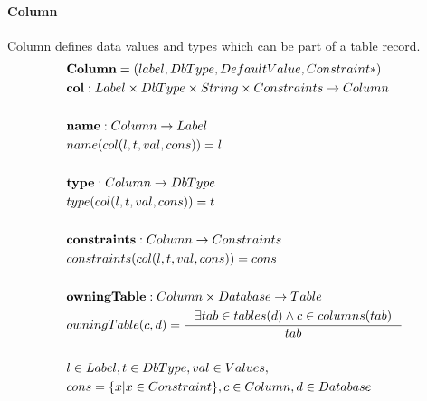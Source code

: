 \documentclass[11pt]{article}
\begin{document}
\paragraph{Column} Column defines data values and types which can be part of a table record.
\begin{align*}
&	\mathbf{Column} = (label, DbType, DefaultValue, Constraint*) \\
&	\mathbf{col} : Label \times DbType \times String \times Constraints \rightarrow Column \\ \\
&	\mathbf{name} : Column \rightarrow Label  \\
&	name(col(l, t, val, cons)) = l  \\ \\
&	\mathbf{type} : Column \rightarrow DbType  \\
&	type(col(l, t, val, cons)) = t  \\ \\
&	\mathbf{constraints} : Column \rightarrow Constraints  \\
&	constraints(col(l, t, val, cons)) = cons  \\ \\
&	\mathbf{owningTable} : Column \times Database \rightarrow Table  \\
&	owningTable(c, d) = \inference{\exists tab \in tables(d) \wedge c \in columns(tab)}{tab} \\ \\
& l \in Label, t \in DbType, val \in Values,\\ 
& cons  = \{ x | x \in Constraint\}, c \in Column,d \in Database
\end{align*}
\end{document}
